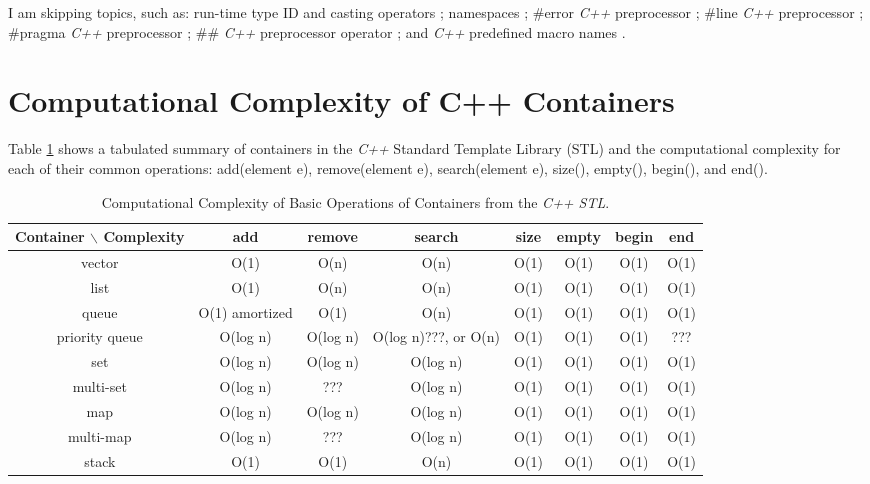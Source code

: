 	I am skipping topics, such as: run-time type ID and casting operators \cite[Chp. 19, pp. 451--470]{Schildt2003a}; namespaces \cite[pp. 472--480]{Schildt2003a}; \#error {\it C++} preprocessor \cite[pp. 552]{Schildt2003a}; \#line {\it C++} preprocessor \cite[pp. 558]{Schildt2003a}; \#pragma {\it C++} preprocessor \cite[pp. 559]{Schildt2003a}; \#\# {\it C++} preprocessor operator \cite[pp. 559--560]{Schildt2003a}; and {\it C++} predefined macro names \cite[pp. 560--561]{Schildt2003a}.





\section{Computational Complexity of C++ Containers}
\label{sec:ComputationalComplexityofCppContainers}


	Table \ref{tab:ComputationalComplexityofCppContainers} shows a tabulated summary of containers in the {\it C++} Standard Template Library (STL) and the computational complexity for each of their common operations: add(element e), remove(element e), search(element e), size(), empty(), begin(), and end(). \\

\begin{table}[htp]
\caption{Computational Complexity of Basic Operations of Containers from the {\it C++ STL}.}	\vspace{-0.2in}
\label{tab:ComputationalComplexityofCppContainers}
	\begin{center}
		\begin{tabular}{|c|c|c|c|c|c|c|c|}
		\hline
		Container $\backslash$ Complexity & add & remove & search & size & empty & begin & end \\
		\hline
		vector & O(1) & O(n) & O(n) & O(1) & O(1) & O(1) & O(1) \\
		\hline
		list & O(1) & O(n) & O(n) & O(1) & O(1) & O(1) & O(1) \\
		\hline
		queue & O(1) amortized & O(1) & O(n) & O(1) & O(1) & O(1) & O(1) \\
		\hline
		priority queue & O(log n) & O(log n) & O(log n)???, or O(n) & O(1) & O(1) & O(1) & ??? \\
		\hline
		set & O(log n) & O(log n) & O(log n) & O(1) & O(1) & O(1) & O(1) \\
		\hline
		multi-set & O(log n) & ??? & O(log n) & O(1) & O(1) & O(1) & O(1) \\
		\hline
		map & O(log n) & O(log n) & O(log n) & O(1) & O(1) & O(1) & O(1) \\
		\hline
		multi-map & O(log n) & ??? & O(log n) & O(1) & O(1) & O(1) & O(1) \\
		\hline
		stack & O(1) & O(1) & O(n) & O(1) & O(1) & O(1) & O(1) \\
		\hline
		\end{tabular}
	\end{center}
\end{table}


